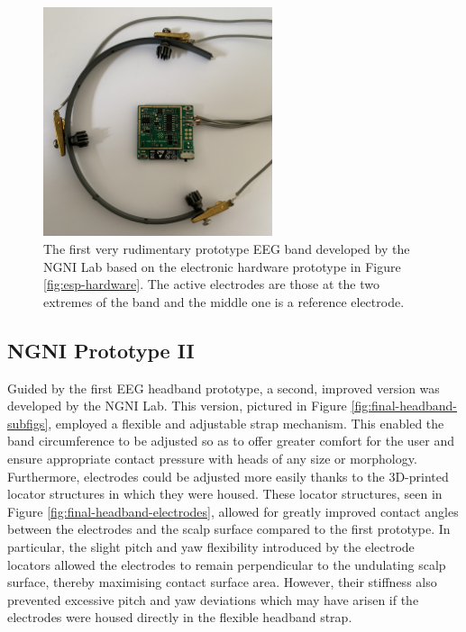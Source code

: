 \begin{figure}
    \centering
    \includegraphics[width=0.6\textwidth]{frankenstein}
    \caption[A very rudimentary first prototype EEG headband]{The first very rudimentary prototype EEG band developed by the NGNI Lab based on the electronic hardware prototype in Figure \ref{fig:esp-hardware}. The active electrodes are those at the two extremes of the band and the middle one is a reference electrode.}
    \label{fig:frakenstein-hardware}
\end{figure}

\subsection{NGNI Prototype II}
Guided by the first EEG headband prototype, a second, improved version was developed by the NGNI Lab. This version, pictured in Figure \ref{fig:final-headband-subfigs}, employed a flexible and adjustable strap mechanism. This enabled the band circumference to be adjusted so as to offer greater comfort for the user and ensure appropriate contact pressure with heads of any size or morphology. Furthermore, electrodes could be adjusted more easily thanks to the 3D-printed locator structures in which they were housed. These locator structures, seen in Figure \ref{fig:final-headband-electrodes}, allowed for greatly improved contact angles between the electrodes and the scalp surface compared to the first prototype. In particular, the slight pitch and yaw flexibility introduced by the electrode locators allowed the electrodes to remain perpendicular to the undulating scalp surface, thereby maximising contact surface area. However, their stiffness also prevented excessive pitch and yaw deviations which may have arisen if the electrodes were housed directly in the flexible headband strap.

